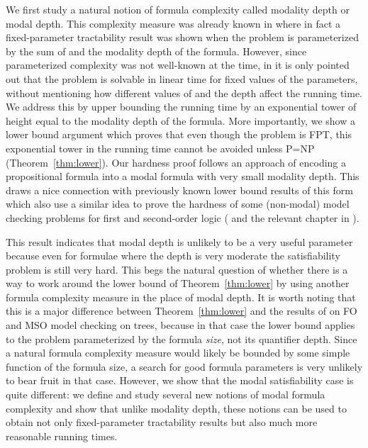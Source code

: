 \documentclass{llncs}
\begin{document}
We first study a natural notion of formula complexity called
modality depth or modal depth. This complexity measure was already
known in \cite{DBLP:journals/ai/Halpern95} where in fact a
fixed-parameter tractability result was shown when the problem is
parameterized by the sum of  and the modality depth of the
formula. However, since parameterized complexity was not well-known
at the time, in \cite{DBLP:journals/ai/Halpern95} it is only pointed
out that the problem is solvable in linear time for fixed values of
the parameters, without mentioning how different values of  and
the depth affect the running time.  We address this by upper
bounding the running time by an exponential tower of height equal to
the modality depth of the formula. More importantly, we show a lower
bound argument which proves that even though the problem is FPT, this
exponential tower in the running time cannot be avoided unless P=NP
(Theorem~\ref{thm:lower}).  Our hardness proof follows an approach of encoding
a propositional formula into a modal formula with very small modality depth.
This draws a nice connection with previously known lower bound results of this
form which also use a similar idea to prove the hardness of some (non-modal)
model checking  problems for first and second-order logic
(\cite{DBLP:journals/apal/FrickG04} and the relevant chapter in
\cite{flum2006pct}).


This result indicates that modal depth is unlikely to be a very useful
parameter because even for formulae where the depth is very moderate the
satisfiability problem is still very hard. This begs the natural question of
whether there is a way to work around the lower bound of
Theorem~\ref{thm:lower} by using another formula complexity measure in the
place of modal depth.  It is worth noting that this is a major difference
between Theorem~\ref{thm:lower} and the results of
\cite{DBLP:journals/apal/FrickG04} on FO and MSO model checking on trees,
because in that case the lower bound applies to the problem parameterized by
the formula \emph{size}, not its quantifier depth.  Since a natural formula
complexity measure would likely be bounded by some simple function of the
formula size, a search for good formula parameters is very unlikely to bear
fruit in that case. However, we show that the modal satisfiability case is
quite different: we define and study several new notions of modal formula
complexity and show that unlike modality depth, these notions can be used to
obtain not only fixed-parameter tractability results but also much more
reasonable running times.
\end{document}
